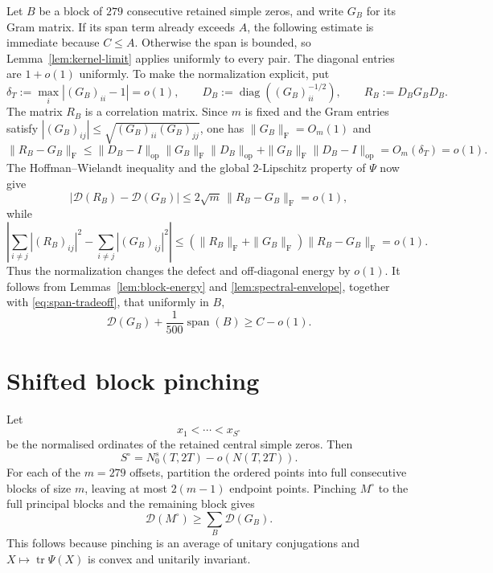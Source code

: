 \documentclass[11pt]{article}
\DeclareMathOperator{\tr}{tr}
\newcommand{\F}{\mathrm F}
\newcommand{\cD}{\mathcal D}
\begin{document}
Let $B$ be a block of $279$ consecutive retained simple zeros, and write
$G_B$ for its Gram matrix.  If its span term already exceeds $A$, the
following estimate is immediate because $C\le A$.  Otherwise the span is
bounded, so Lemma~\ref{lem:kernel-limit} applies uniformly to every pair.
The diagonal entries are $1+o(1)$ uniformly.  To make the normalization
explicit, put
\[
 \delta_T:=\max_i |(G_B)_{ii}-1|=o(1),\qquad
 D_B:=\operatorname{diag}((G_B)_{ii}^{-1/2}),\qquad
 R_B:=D_BG_BD_B.
\]
The matrix $R_B$ is a correlation matrix.  Since $m$ is fixed and the Gram
entries satisfy $|(G_B)_{ij}|\le
\sqrt{(G_B)_{ii}(G_B)_{jj}}$, one has $\|G_B\|_{\F}=O_m(1)$ and
\[
 \|R_B-G_B\|_{\F}
 \le \|D_B-I\|_{\mathrm{op}}\|G_B\|_{\F}\|D_B\|_{\mathrm{op}}
    +\|G_B\|_{\F}\|D_B-I\|_{\mathrm{op}}
 =O_m(\delta_T)=o(1).
\]
The Hoffman--Wielandt inequality and the global $2$-Lipschitz property of
$\Psi$ now give
\[
 |\cD(R_B)-\cD(G_B)|
 \le 2\sqrt m\,\|R_B-G_B\|_{\F}=o(1),
\]
while
\[
 \left|\sum_{i\ne j}|(R_B)_{ij}|^2
       -\sum_{i\ne j}|(G_B)_{ij}|^2\right|
 \le (\|R_B\|_{\F}+\|G_B\|_{\F})\|R_B-G_B\|_{\F}=o(1).
\]
Thus the normalization changes the defect and off-diagonal energy by $o(1)$.
It follows from Lemmas~\ref{lem:block-energy} and
\ref{lem:spectral-envelope}, together with \eqref{eq:span-tradeoff}, that
uniformly in $B$,
\begin{equation}\label{eq:279block}
 \cD(G_B)+\frac1{500}\operatorname{span}(B)
 \ge C-o(1).
\end{equation}

\clearpage
\section{Shifted block pinching}

Let
\[
 x_1<\cdots<x_{S^\circ}
\]
be the normalised ordinates of the retained central simple zeros.  Then
\begin{equation}\label{eq:Scentral}
 S^\circ=N_0^s(T,2T)-o(N(T,2T)).
\end{equation}
For each of the $m=279$ offsets, partition the ordered points into full
consecutive blocks of size $m$, leaving at most $2(m-1)$ endpoint points.
Pinching $M^\circ$ to the full principal blocks and the remaining block gives
\begin{equation}\label{eq:pinching}
 \cD(M^\circ)\ge\sum_B\cD(G_B).
\end{equation}
This follows because pinching is an average of unitary conjugations and
$X\mapsto\tr\Psi(X)$ is convex and unitarily invariant.
\end{document}
